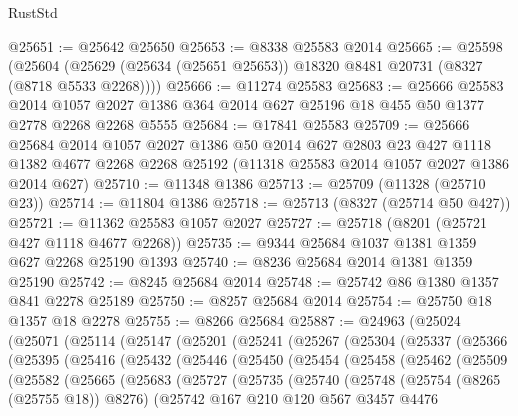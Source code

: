 \begin{lexlean}{RustStd}
\begin{coremodule}
{\begin{coremodule}
{{{{{{{{{{{{{{{{{{{{{{{{{{{{{{{{{{{{{{{{{{{{{{{{{{{{{{@25651 := @25642 @25650
@25653 := @8338 @25583 @2014
@25665 := @25598
    (@25604 (@25629 (@25634 (@25651 @25653)) @18320 @8481 @20731 (@8327 (@8718 @5533 @2268))))
@25666 := @11274 @25583
@25683 := @25666
    @25583
    @2014
    @1057
    @2027
    @1386
    @364
    @2014
    @627
    @25196
    @18
    @455
    @50
    @1377
    @2778
    @2268
    @2268
    @5555
@25684 := @17841 @25583
@25709 := @25666
    @25684
    @2014
    @1057
    @2027
    @1386
    @50
    @2014
    @627
    @2803
    @23
    @427
    @1118
    @1382
    @4677
    @2268
    @2268
    @25192
    (@11318 @25583 @2014 @1057 @2027 @1386 @2014 @627)
@25710 := @11348 @1386
@25713 := @25709 (@11328 (@25710 @23))
@25714 := @11804 @1386
@25718 := @25713 (@8327 (@25714 @50 @427))
@25721 := @11362 @25583 @1057 @2027
@25727 := @25718 (@8201 (@25721 @427 @1118 @4677 @2268))
@25735 := @9344 @25684 @1037 @1381 @1359 @627 @2268 @25190 @1393
@25740 := @8236 @25684 @2014 @1381 @1359 @25190
@25742 := @8245 @25684 @2014
@25748 := @25742 @86 @1380 @1357 @841 @2278 @25189
@25750 := @8257 @25684 @2014
@25754 := @25750 @18 @1357 @18 @2278
@25755 := @8266 @25684
@25887 := @24963
    (@25024
      (@25071
        (@25114
          (@25147
            (@25201
              (@25241
                (@25267
                  (@25304
                    (@25337
                      (@25366
                        (@25395
                          (@25416
                            (@25432
                              (@25446
                                (@25450
                                  (@25454
                                    (@25458
                                      (@25462
                                        (@25509
                                          (@25582
                                            (@25665
                                              (@25683
                                                (@25727
                                                  (@25735
                                                    (@25740
                                                      (@25748
                                                        (@25754 (@8265 (@25755 @18)) @8276)
                                                        (@25742
                                                          @167
                                                          @210
                                                          @120
                                                          @567
                                                          @3457
                                                          @4476
}}}}}}}}}}}}}}}}}}}}}}}}}}}}}}}}}}}}}}}}}}}}}}}}}}}}}}
\end{coremodule}}
\end{coremodule}
\end{lexlean}
